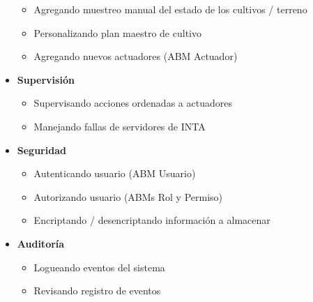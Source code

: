 \begin{itemize}
\begin{itemize}
		\item Agregando muestreo manual del estado de los cultivos / terreno
		\item Personalizando plan maestro de cultivo
		\item Agregando nuevos actuadores (ABM Actuador)
    \end{itemize}
    \item \textbf{Supervisión}
    \vspace{-7pt}
    \begin{itemize} \itemsep -2pt
    	\item Supervisando acciones ordenadas a actuadores
        \item Manejando fallas de servidores de INTA
    \end{itemize}
    \item \textbf{Seguridad}
    \vspace{-7pt}
    \begin{itemize} \itemsep -2pt
		\item Autenticando usuario (ABM Usuario)
		\item Autorizando usuario (ABMs Rol y Permiso)
		\item Encriptando / desencriptando información a almacenar
    \end{itemize}
    \item \textbf{Auditoría}
    \vspace{-7pt}
    \begin{itemize} \itemsep -2pt
    	\item Logueando eventos del sistema
		\item Revisando registro de eventos
    \end{itemize}
\end{itemize}

